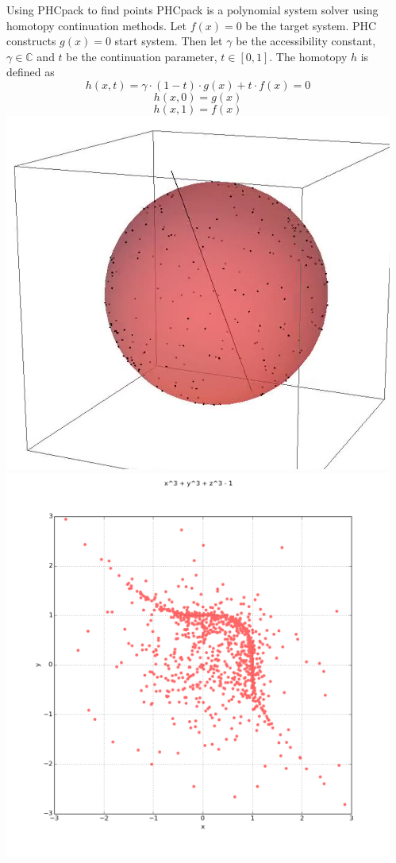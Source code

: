 \documentclass{beamer}
\def\C{\mathbb C}
\begin{document}
\begin{frame}{}
\begin{columns}[t]
\begin{column}{0.32\linewidth}
\begin{block}{Using PHCpack to find points}
PHCpack is a polynomial system solver using homotopy continuation methods. Let $f(x) = 0$ be the target system. PHC constructs $g(x)=0$ start system. Then let $\gamma$ be the accessibility constant, $\gamma \in \C$ and $t$ be the continuation parameter, $t \in [0,1]$. The homotopy $h$ is defined as
\begin{equation*}
h(x,t) = \gamma \cdot (1-t)\cdot g(x) + t \cdot f(x) = 0
\end{equation*}
\begin{equation*}
h(x, 0) =g(x)
\end{equation*}
\begin{equation*}
h(x, 1) = f(x)
\end{equation*}
\includegraphics[width=.5\columnwidth]{sphere}
\includegraphics[width=.5\columnwidth]{plot2d_5}


\end{block}


\end{column}%

\begin{column}{0.32\linewidth}


\end{column}
\end{columns}
\end{frame}
\end{document}
